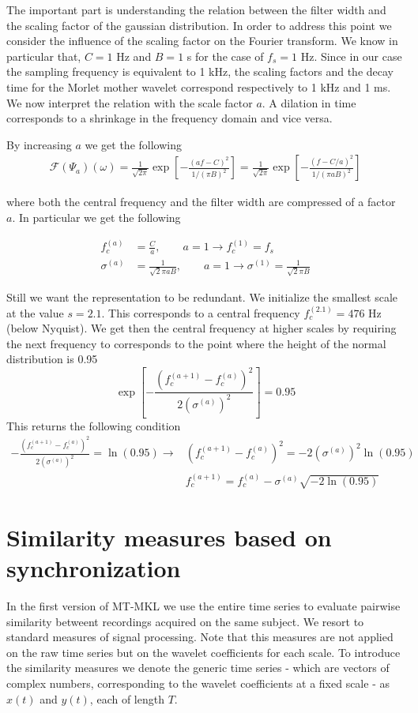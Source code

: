 \documentclass[a4paper]{article}
\begin{document}
The important part is understanding the relation between the filter width and the scaling factor of the gaussian distribution. In order to address this point we consider the influence of the scaling factor on the Fourier transform.
We know in particular that, $C=1$ Hz and $B=1$ s for the case of $f_s=1$ Hz. Since in our case the sampling frequency is equivalent to 1 kHz, the scaling factors and the decay time for the Morlet mother wavelet correspond respectively to 1 kHz and 1 ms.
We now interpret the relation with the scale factor $a$. A dilation in time corresponds to a shrinkage in the frequency domain and vice versa.

By increasing $a$ we get the following
\begin{align*}
 \mathcal{F}(\Psi_a)(\omega) = \frac{1}{\sqrt{2\pi}} \exp\left[-\frac{(a f - C)^2}{1/(\pi B)^2}\right] =
 \frac{1}{\sqrt{2\pi}} \exp\left[-\frac{(f - C/a)^2}{1/(\pi a B)^2}\right]
\end{align*}

where both the central frequency and the filter width are compressed of a factor $a$. In particular we get the following

\begin{align}
  f^{(a)}_c &= \frac{C}{a}, \qquad a=1 \rightarrow f^{(1)}_c=f_s \\
  \sigma^{(a)} &= \frac{1}{\sqrt{2}\pi a B}, \qquad a=1 \rightarrow \sigma^{(1)}= \frac{1}{\sqrt{2}\pi B}
\end{align}

Still we want the representation to be redundant. We initialize the smallest scale at the value $s=2.1$. This corresponds to a central frequency $f^{(2.1)}_c=476$ Hz (below Nyquist). We get then the central frequency at higher scales by requiring the next frequency to corresponds to the point where the height of the normal distribution is 0.95
\begin{equation}
  \exp\left[-\frac{\left(f^{(a+1)}_c-f^{(a)}_c\right)^2}{2 \left(\sigma^{(a)}\right)^2}\right] = 0.95
\end{equation}
This returns the following condition
\begin{align*}
 -\frac{\left(f^{(a+1)}_c-f^{(a)}_c\right)^2}{2 \left(\sigma^{(a)}\right)^2} = \ln(0.95) \rightarrow & \left(f^{(a+1)}_c-f^{(a)}_c\right)^2 = -2 \left(\sigma^{(a)}\right)^2 \ln(0.95) \\
  & f^{(a+1)}_c = f^{(a)}_c - \sigma^{(a)}\sqrt{-2 \ln(0.95)}
\end{align*}

\section{Similarity measures based on synchronization}
In the first version of MT-MKL we use the entire time series to evaluate pairwise similarity betweent recordings acquired on the same subject. We resort to standard measures of signal processing. Note that this measures are not applied on the raw time series but on the wavelet coefficients for each scale. To introduce the similarity measures we denote the generic time series - which are vectors of complex numbers, corresponding to the wavelet coefficients at a fixed scale - as $x(t)$ and $y(t)$, each of length $T$.
\end{document}
